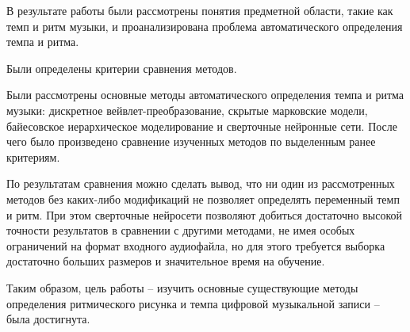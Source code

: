 
В результате работы были рассмотрены понятия предметной области, такие как темп и ритм музыки, и проанализирована проблема автоматического определения темпа и ритма.

Были определены критерии сравнения методов.

Были рассмотрены основные методы автоматического определения темпа и ритма музыки: дискретное вейвлет-преобразование, скрытые марковские модели, байесовское иерархическое моделирование и сверточные нейронные сети. После чего было произведено сравнение изученных методов по выделенным ранее критериям.

По результатам сравнения можно сделать вывод, что ни один из рассмотренных методов без каких-либо модификаций не позволяет определять переменный темп и ритм. При этом сверточные нейросети позволяют добиться достаточно высокой точности результатов в сравнении с другими методами, не имея особых ограничений на формат входного аудиофайла, но для этого требуется выборка достаточно больших размеров и значительное время на обучение.

Таким образом, цель работы -- изучить основные существующие методы определения ритмического рисунка и темпа цифровой музыкальной записи -- была достигнута.